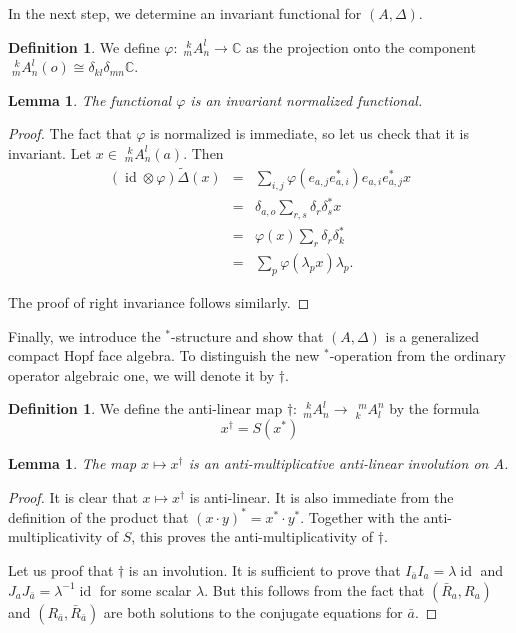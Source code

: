 \documentclass[12pt]{article}
\theoremstyle{change}
\DeclareMathOperator{\id}{id}
\newcommand{\C}{\mathbb{C}}
\newcommand{\Gr}[5]{\;{}^{\;#2}_{#4}#1_{#5}^{#3}}%
\newtheorem{Lem}[Theorem]{Lemma}
\theoremstyle{definition}
\newtheorem{Def}[Theorem]{Definition}
\numberwithin{equation}{section}
\begin{document}
In the next step, we determine an invariant functional for $(A,\Delta)$.

\begin{Def} We define $\varphi: \Gr{A}{k}{l}{m}{n} \rightarrow \C$ as the projection onto the component $\Gr{A}{k}{l}{m}{n}(o) \cong \delta_{kl}\delta_{mn} \C$.
\end{Def}

\begin{Lem} The functional $\varphi$ is an invariant normalized functional.
\end{Lem}

\begin{proof} The fact that $\varphi$ is normalized is immediate, so let us check that it is invariant. Let $x\in \Gr{A}{k}{l}{m}{n}(a)$. Then \begin{eqnarray*} (\id\otimes \varphi)\widetilde{\Delta}(x) &=& \sum_{i,j}  \varphi(e_{a,j}e_{a,i}^*)e_{a,i}e_{a,j}^*x \\ &=& \delta_{a,o} \sum_{r,s}\delta_r\delta_s^* x \\ &=& \varphi(x)\sum_r\delta_r\delta_k^*  \\ &=& \sum_p\varphi(\lambda_px)\lambda_p.\end{eqnarray*}

The proof of right invariance follows similarly.
\end{proof}

Finally, we introduce the $^*$-structure and show that $(A,\Delta)$ is a generalized compact Hopf face algebra. To distinguish the new $^*$-operation from the ordinary operator algebraic one, we will denote it by $\dagger$.

\begin{Def} We define the anti-linear map $\dagger: \Gr{A}{k}{l}{m}{n} \rightarrow \Gr{A}{m}{n}{k}{l}$ by the formula \[ x^{\dagger} = S(x^*) \]
\end{Def}

\begin{Lem} The map $x\mapsto x^{\dagger}$ is an anti-multiplicative anti-linear involution on $A$.
\end{Lem}

\begin{proof} It is clear that $x\mapsto x^{\dagger}$ is anti-linear. It is also immediate from the definition of the product that $(x\cdot y)^* = x^*\cdot y^*$. Together with the anti-multiplicativity of $S$, this proves the anti-multiplicativity of $\dagger$.

Let us proof that $\dagger$ is an involution. It is sufficient to prove that $I_{\bar{a}}I_a= \lambda\id$ and $J_aJ_{\bar{a}} = \lambda^{-1}\id$ for some scalar $\lambda$. But this follows from the fact that $(\bar{R}_a,R_a)$ and $(R_{\bar{a}},\bar{R}_{\bar{a}})$ are both solutions to the conjugate equations for $\bar{a}$.
\end{proof}
\end{document}
